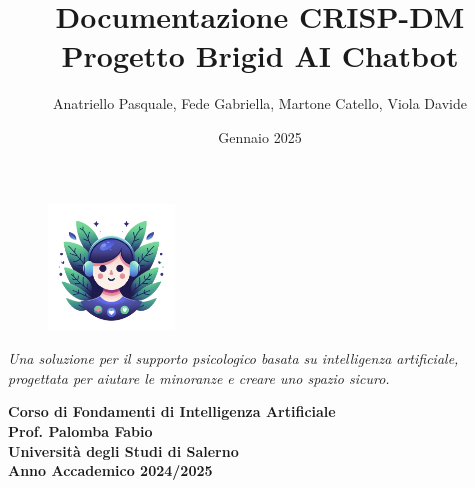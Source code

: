 \documentclass[12pt, letterpaper]{article}
\title{\Huge \textbf{Documentazione CRISP-DM}\\[0.5cm]
	\Large \textbf{Progetto Brigid AI Chatbot}}
\author{\large Anatriello Pasquale, Fede Gabriella, Martone Catello, Viola Davide}
\date{\large Gennaio 2025}
\begin{document}
	
	\begin{figure}[t]
		\centering
		\includegraphics[width=0.3\textwidth]{brigid.png} %
	\end{figure}
	
	\maketitle
	\vfill
	
	\begin{center}
		\large
		\textit{Una soluzione per il supporto psicologico basata su intelligenza artificiale, \\
			progettata per aiutare le minoranze e creare uno spazio sicuro.}
	\end{center}
	
	\vfill
	
	\begin{center}
		\textbf{Corso di Fondamenti di Intelligenza Artificiale} \\[0.1cm]
		\textbf{Prof. Palomba Fabio} \\[0.1cm]
		\textbf{Università degli Studi di Salerno} \\[0.1cm]
		\textbf{Anno Accademico 2024/2025}
	\end{center}
	
\end{document}

